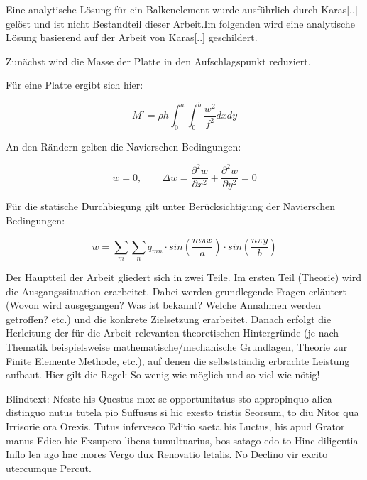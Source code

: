 Eine analytische Lösung für ein Balkenelement wurde ausführlich durch Karas[..] gelöst und ist nicht Bestandteil dieser Arbeit.Im folgenden wird eine analytische Lösung basierend auf der Arbeit von Karas[..] geschildert.

Zunächst wird die Masse der Platte in den Aufschlagspunkt reduziert.

Für eine Platte ergibt sich hier:

$$M'=\rho h \int_0^a \int_0^b \dfrac{w^2}{f^2} dx dy$$

An den Rändern gelten die Navierschen Bedingungen:

\begin{equation} 
\tag{$x$ = 0, a ; \quad  $y=0, b$}w = 0, \qquad \Delta w = \dfrac{\partial^2 w}{\partial x^2} + \dfrac{\partial^2 w}{\partial y^2} = 0
 \end{equation}

Für die statische Durchbiegung gilt unter Berücksichtigung der Navierschen Bedingungen:


\begin{equation} 
\tag{$m,n = 1, 2, 3, 4, ...$}w = \sum_m \sum_n q_{mn} \cdot sin\left(\dfrac{m \pi x}{a}\right) \cdot sin\left(\dfrac{n \pi y}{b}\right)
\end{equation} 



Der Hauptteil der Arbeit gliedert sich in zwei Teile. Im ersten Teil (Theorie) wird die Ausgangssituation erarbeitet. Dabei werden grundlegende Fragen erläutert (Wovon wird ausgegangen? Was ist bekannt? Welche Annahmen werden getroffen? etc.) und die konkrete Zielsetzung erarbeitet. Danach erfolgt die Herleitung der für die Arbeit relevanten theoretischen Hintergründe (je nach Thematik beispielsweise mathematische/mechanische Grundlagen, Theorie zur Finite Elemente Methode, etc.), auf denen die selbstständig erbrachte Leistung aufbaut. Hier gilt die Regel: So wenig wie möglich und so viel wie nötig! 

Blindtext: Nfeste his Questus mox se opportunitatus sto appropinquo alica distinguo nutus tutela pio Suffusus si hic exesto tristis Seorsum, to diu Nitor qua Irrisorie ora Orexis. Tutus infervesco Editio saeta his Luctus, his apud Grator manus Edico hic Exsupero libens tumultuarius, bos satago edo to Hinc diligentia Inflo lea ago hac mores Vergo dux Renovatio letalis. No Declino vir excito utercumque Percut.
